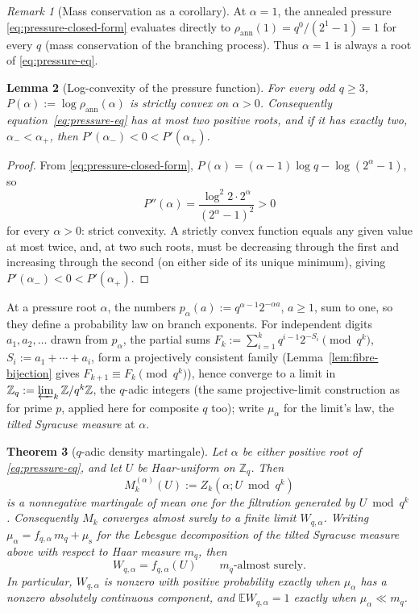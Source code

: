\documentclass[11pt]{article}
\newtheorem{theorem}{Theorem}[section]
\newtheorem{lemma}[theorem]{Lemma}
\theoremstyle{remark}
\newtheorem{remark}[theorem]{Remark}
\begin{document}
\begin{remark}[Mass conservation as a corollary]
At $\alpha=1$, the annealed pressure \eqref{eq:pressure-closed-form}
evaluates directly to $\rho_{\mathrm{ann}}(1)=q^0/(2^1-1)=1$ for every
$q$ (mass conservation of the branching process). Thus $\alpha=1$ is
always a root of \eqref{eq:pressure-eq}.
\end{remark}

\begin{lemma}[Log-convexity of the pressure function]\label{lem:log-convex}
For every odd $q\ge3$, $P(\alpha):=\log\rho_{\mathrm{ann}}(\alpha)$ is
strictly convex on $\alpha>0$. Consequently
equation~\eqref{eq:pressure-eq} has at most two positive roots, and if
it has exactly two, $\alpha_-<\alpha_+$, then $P'(\alpha_-)<0<P'(\alpha_+)$.
\end{lemma}
\begin{proof}
From \eqref{eq:pressure-closed-form}, $P(\alpha)=(\alpha-1)\log q-\log(2^\alpha-1)$, so
\[
 P''(\alpha)=\frac{\log^2 2\cdot 2^\alpha}{(2^\alpha-1)^2}>0
\]
for every $\alpha>0$: strict convexity. A strictly convex function
equals any given value at most twice, and, at two such roots, must be
decreasing through the first and increasing through the second (on
either side of its unique minimum), giving $P'(\alpha_-)<0<P'(\alpha_+)$.
\end{proof}

At a pressure root $\alpha$, the numbers $p_\alpha(a):=q^{\alpha-1}2^{-\alpha a}$,
$a\ge1$, sum to one, so they define a probability law on branch
exponents. For independent digits $a_1,a_2,\ldots$ drawn from
$p_\alpha$, the partial sums
$F_k:=\sum_{i=1}^k q^{i-1}2^{-S_i}\pmod{q^k}$, $S_i:=a_1+\cdots+a_i$,
form a projectively consistent family (Lemma~\ref{lem:fibre-bijection}
gives $F_{k+1}\equiv F_k\pmod{q^k}$), hence converge to a limit in
$\mathbb{Z}_q:=\varprojlim_k\mathbb{Z}/q^k\mathbb{Z}$, the $q$-adic
integers (the same projective-limit construction as for prime $p$,
applied here for composite $q$ too); write $\mu_\alpha$ for the limit's
law, the \emph{tilted Syracuse measure} at $\alpha$.

\begin{theorem}[$q$-adic density martingale]\label{thm:qadic-martingale}
Let $\alpha$ be either positive root of \eqref{eq:pressure-eq}, and let
$U$ be Haar-uniform on $\mathbb Z_q$.
Then
\[
 M_k^{(\alpha)}(U):=Z_k(\alpha;U\bmod q^k)
\]
is a nonnegative martingale of mean one for the filtration generated by
$U\bmod q^k$. Consequently $M_k$ converges almost surely to a finite
limit $W_{q,\alpha}$. Writing
$\mu_\alpha=f_{q,\alpha}\,m_q+\mu_{\mathrm s}$ for the Lebesgue
decomposition of the tilted Syracuse measure above
with respect to Haar measure $m_q$, then
\[
 W_{q,\alpha}=f_{q,\alpha}(U)\qquad m_q\text{-almost surely}.
\]
In particular, $W_{q,\alpha}$ is nonzero with positive probability
exactly when $\mu_\alpha$ has a nonzero absolutely continuous component,
and $\mathbb E W_{q,\alpha}=1$ exactly when $\mu_\alpha\ll m_q$.
\end{theorem}
\end{document}

